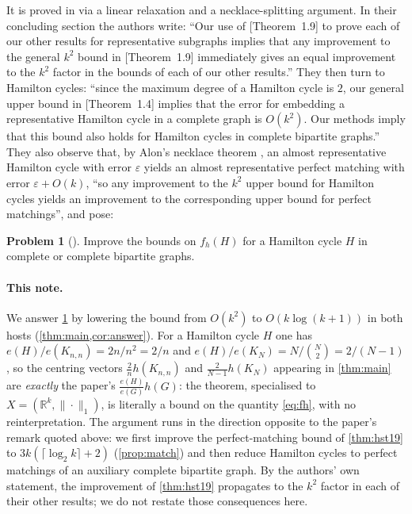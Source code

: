 \documentclass[11pt,a4paper]{article}
\theoremstyle{plain}
\theoremstyle{definition}
\newtheorem{problem}[theorem]{Problem}
\theoremstyle{remark}
\newcommand{\R}{\mathbb R}
\begin{document}
It is proved in \cite{HST26} via a linear relaxation and a necklace-splitting argument. In their concluding section the authors write: ``Our use of [Theorem~1.9] to prove each of our other results for representative subgraphs implies that any improvement to the general $k^2$ bound in [Theorem~1.9] immediately gives an equal improvement to the $k^2$ factor in the bounds of each of our other results.'' \cite[\S6]{HST26} They then turn to Hamilton cycles: ``since the maximum degree of a Hamilton cycle is $2$, our general upper bound in [Theorem~1.4] implies that the error for embedding a representative Hamilton cycle in a complete graph is $O(k^2)$. Our methods imply that this bound also holds for Hamilton cycles in complete bipartite graphs.'' They also observe that, by Alon's necklace theorem \cite{Alon87}, an almost representative Hamilton cycle with error $\varepsilon$ yields an almost representative perfect matching with error $\varepsilon+O(k)$, ``so any improvement to the $k^2$ upper bound for Hamilton cycles yields an improvement to the corresponding upper bound for perfect matchings'', and pose:

\begin{problem}[{\cite[Problem~6.4]{HST26}}]\label{prob:64}
Improve the bounds on $f_h(H)$ for a Hamilton cycle $H$ in complete or complete bipartite graphs.
\end{problem}

\paragraph{This note.}
We answer \cref{prob:64} by lowering the bound from $O(k^2)$ to $O(k\log(k+1))$ in both hosts (\cref{thm:main,cor:answer}). For a Hamilton cycle $H$ one has $e(H)/e(K_{n,n})=2n/n^2=2/n$ and $e(H)/e(K_N)=N/\binom N2=2/(N-1)$, so the centring vectors $\frac2n h(K_{n,n})$ and $\frac2{N-1}h(K_N)$ appearing in \cref{thm:main} are \emph{exactly} the paper's $\frac{e(H)}{e(G)}h(G)$: the theorem, specialised to $X=(\R^k,\|\cdot\|_1)$, is literally a bound on the quantity \eqref{eq:fh}, with no reinterpretation. The argument runs in the direction opposite to the paper's remark quoted above: we first improve the perfect-matching bound of \cref{thm:hst19} to $3k(\lceil\log_2k\rceil+2)$ (\cref{prop:match}) and then reduce Hamilton cycles to perfect matchings of an auxiliary complete bipartite graph. By the authors' own statement, the improvement of \cref{thm:hst19} propagates to the $k^2$ factor in each of their other results; we do not restate those consequences here.
\end{document}
